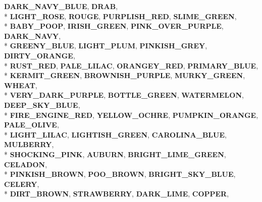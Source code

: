 \begin{DoxyCompactItemize}
{\bfseries D\+A\+R\+K\+\_\+\+N\+A\+V\+Y\+\_\+\+B\+L\+UE}, 
{\bfseries D\+R\+AB}, 
\\*
{\bfseries L\+I\+G\+H\+T\+\_\+\+R\+O\+SE}, 
{\bfseries R\+O\+U\+GE}, 
{\bfseries P\+U\+R\+P\+L\+I\+S\+H\+\_\+\+R\+ED}, 
{\bfseries S\+L\+I\+M\+E\+\_\+\+G\+R\+E\+EN}, 
\\*
{\bfseries B\+A\+B\+Y\+\_\+\+P\+O\+OP}, 
{\bfseries I\+R\+I\+S\+H\+\_\+\+G\+R\+E\+EN}, 
{\bfseries P\+I\+N\+K\+\_\+\+O\+V\+E\+R\+\_\+\+P\+U\+R\+P\+LE}, 
{\bfseries D\+A\+R\+K\+\_\+\+N\+A\+VY}, 
\\*
{\bfseries G\+R\+E\+E\+N\+Y\+\_\+\+B\+L\+UE}, 
{\bfseries L\+I\+G\+H\+T\+\_\+\+P\+L\+UM}, 
{\bfseries P\+I\+N\+K\+I\+S\+H\+\_\+\+G\+R\+EY}, 
{\bfseries D\+I\+R\+T\+Y\+\_\+\+O\+R\+A\+N\+GE}, 
\\*
{\bfseries R\+U\+S\+T\+\_\+\+R\+ED}, 
{\bfseries P\+A\+L\+E\+\_\+\+L\+I\+L\+AC}, 
{\bfseries O\+R\+A\+N\+G\+E\+Y\+\_\+\+R\+ED}, 
{\bfseries P\+R\+I\+M\+A\+R\+Y\+\_\+\+B\+L\+UE}, 
\\*
{\bfseries K\+E\+R\+M\+I\+T\+\_\+\+G\+R\+E\+EN}, 
{\bfseries B\+R\+O\+W\+N\+I\+S\+H\+\_\+\+P\+U\+R\+P\+LE}, 
{\bfseries M\+U\+R\+K\+Y\+\_\+\+G\+R\+E\+EN}, 
{\bfseries W\+H\+E\+AT}, 
\\*
{\bfseries V\+E\+R\+Y\+\_\+\+D\+A\+R\+K\+\_\+\+P\+U\+R\+P\+LE}, 
{\bfseries B\+O\+T\+T\+L\+E\+\_\+\+G\+R\+E\+EN}, 
{\bfseries W\+A\+T\+E\+R\+M\+E\+L\+ON}, 
{\bfseries D\+E\+E\+P\+\_\+\+S\+K\+Y\+\_\+\+B\+L\+UE}, 
\\*
{\bfseries F\+I\+R\+E\+\_\+\+E\+N\+G\+I\+N\+E\+\_\+\+R\+ED}, 
{\bfseries Y\+E\+L\+L\+O\+W\+\_\+\+O\+C\+H\+RE}, 
{\bfseries P\+U\+M\+P\+K\+I\+N\+\_\+\+O\+R\+A\+N\+GE}, 
{\bfseries P\+A\+L\+E\+\_\+\+O\+L\+I\+VE}, 
\\*
{\bfseries L\+I\+G\+H\+T\+\_\+\+L\+I\+L\+AC}, 
{\bfseries L\+I\+G\+H\+T\+I\+S\+H\+\_\+\+G\+R\+E\+EN}, 
{\bfseries C\+A\+R\+O\+L\+I\+N\+A\+\_\+\+B\+L\+UE}, 
{\bfseries M\+U\+L\+B\+E\+R\+RY}, 
\\*
{\bfseries S\+H\+O\+C\+K\+I\+N\+G\+\_\+\+P\+I\+NK}, 
{\bfseries A\+U\+B\+U\+RN}, 
{\bfseries B\+R\+I\+G\+H\+T\+\_\+\+L\+I\+M\+E\+\_\+\+G\+R\+E\+EN}, 
{\bfseries C\+E\+L\+A\+D\+ON}, 
\\*
{\bfseries P\+I\+N\+K\+I\+S\+H\+\_\+\+B\+R\+O\+WN}, 
{\bfseries P\+O\+O\+\_\+\+B\+R\+O\+WN}, 
{\bfseries B\+R\+I\+G\+H\+T\+\_\+\+S\+K\+Y\+\_\+\+B\+L\+UE}, 
{\bfseries C\+E\+L\+E\+RY}, 
\\*
{\bfseries D\+I\+R\+T\+\_\+\+B\+R\+O\+WN}, 
{\bfseries S\+T\+R\+A\+W\+B\+E\+R\+RY}, 
{\bfseries D\+A\+R\+K\+\_\+\+L\+I\+ME}, 
{\bfseries C\+O\+P\+P\+ER}, 

\end{DoxyCompactItemize}
